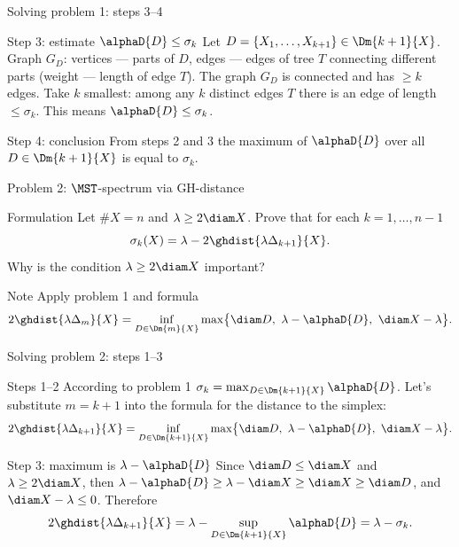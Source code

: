 \documentclass[aspectratio=169,11pt]{beamer}
\begin{document}
\begin{frame}{Solving problem \textup{1}: steps \textup{3}--\textup{4}}
\begin{block}{Step \textup{3}: estimate $\alphaD{D} \le \sigma_k$}
Let $D = \{X_1, \dots, X_{k+1}\} \in \Dm{k+1}{X}$. Graph $G_D$: vertices --- parts of $D$, edges --- edges of tree $T$ connecting different parts (weight --- length of edge $T$). The graph $G_D$ is connected and has $\ge k$ edges. Take $k$ smallest\textup{:} among any $k$ distinct edges $T$ there is an edge of length $\le \sigma_k$. This means $\alphaD{D} \le \sigma_k$.
\end{block}
\begin{block}{Step \textup{4}: conclusion}
From steps \textup{2} and \textup{3} the maximum of $\alphaD{D}$ over all $D \in \Dm{k+1}{X}$ is equal to $\sigma_k$.
\end{block}
\end{frame}

\begin{frame}{Problem \textup{2}: $\MST$-spectrum via GH-distance}
\begin{block}{Formulation}
Let $\#X = n$ and $\lambda \ge 2 \diam X$. Prove that for each $k = 1, \dots, n-1$
\[
\sigma_k(X) = \lambda - 2 \ghdist{\lambda \Delta_{k+1}}{X}.
\]
Why is the condition $\lambda \ge 2\diam X$ important?
\end{block}
\begin{block}{Note}
Apply problem \textup{1} and formula
\[
2 \ghdist{\lambda\Delta_m}{X} = \inf_{D \in \Dm{m}{X}} \max\bigl\{\diam D,\ \lambda - \alphaD{D},\ \diam X - \lambda\bigr\}.
\]
\end{block}
\end{frame}

\begin{frame}{Solving problem \textup{2}: steps \textup{1}--\textup{3}}
\begin{block}{Steps \textup{1}--\textup{2}}
According to problem \textup{1} $\sigma_k = \max_{D \in \Dm{k+1}{X}} \alphaD{D}$. Let's substitute $m = k+1$ into the formula for the distance to the simplex:
\[
2\ghdist{\lambda\Delta_{k+1}}{X} = \inf_{D \in \Dm{k+1}{X}} \max\bigl\{\diam D,\ \lambda - \alphaD{D},\ \diam X - \lambda\bigr\}.
\]
\end{block}
\begin{block}{Step \textup{3}: maximum is $\lambda - \alphaD{D}$}
Since $\diam D \le \diam X$ and $\lambda \ge 2 \diam X$, then $\lambda - \alphaD{D} \ge \lambda - \diam X \ge \diam X \ge \diam D$, and $\diam X - \lambda \le 0$. Therefore
\[
2\ghdist{\lambda\Delta_{k+1}}{X} = \lambda - \sup_{D \in \Dm{k+1}{X}} \alphaD{D} = \lambda - \sigma_k .
\]
\end{block}
\end{frame}
\end{document}
